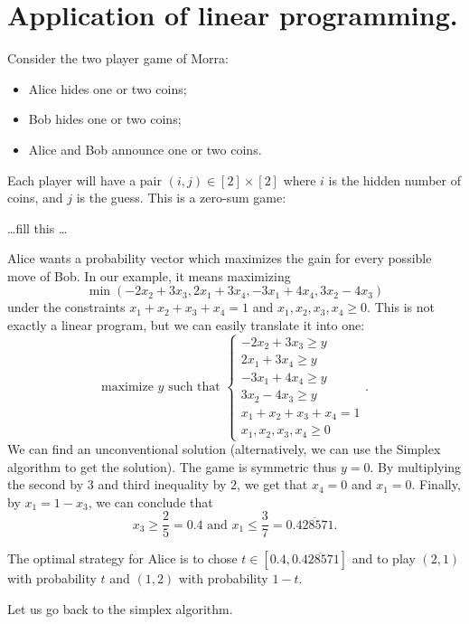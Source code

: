 \documentclass[./main]{subfiles}
\begin{document}
  \chapter{Application of linear programming.}


  Consider the two player game of Morra:
  \begin{itemize}
    \item Alice hides one or two coins;
    \item Bob hides one or two coins;
    \item Alice and Bob announce one or two coins.
  \end{itemize}
  Each player will have a pair $(i, j) \in [2] \times [2]$ where $i$ is the hidden number of coins, and $j$ is the guess.
  This is a zero-sum game: 

  \ldots fill this \ldots

  Alice wants a probability vector which maximizes the gain for every possible move of Bob.
  In our example, it means maximizing \[
  \min (-2 x_2 + 3x_3, 2 x_1 + 3 x_4, -3x_1 + 4x_4, 3 x_2 - 4x_3)
  \] 
  under the constraints $x_1 + x_2 + x_3 + x_4 = 1$ and $x_1, x_2, x_3, x_4 \ge 0$.
  This is not exactly a linear program, but we can easily translate it into one:
  \[
    \text{maximize } y \text{ such that }
    \begin{cases}
      -2 x_2 + 3x_3 \ge y \\
      2 x_1 + 3 x_4 \ge y \\
      -3x_1 + 4x_4 \ge y \\
      3 x_2 - 4x_3 \ge y \\
      x_1 + x_2 + x_3 + x_4 = 1\\
      x_1, x_2, x_3, x_4 \ge 0
    \end{cases}
  .\]
  We can find an unconventional solution (alternatively, we can use the Simplex algorithm to get the solution).
  The game is symmetric thus $y = 0$.
  By multiplying the second by $3$ and third inequality by $2$, we get that  $x_4 = 0$ and $x_1 = 0$.
  Finally, by $x_1 = 1 - x_3$, we can conclude that \[
    x_3 \ge \frac{2}{5} = 0.4 \text{ and } x_1 \le \frac{3}{7} = 0.\overline{428571}
  .\]

  The optimal strategy for Alice is to chose $t \in [0.4, 0.\overline{428571}]$ and to play $(2, 1)$ with probability  $t$ and $(1, 2)$ with probability $1-t$.

  Let us go back to the simplex algorithm.
\end{document}
